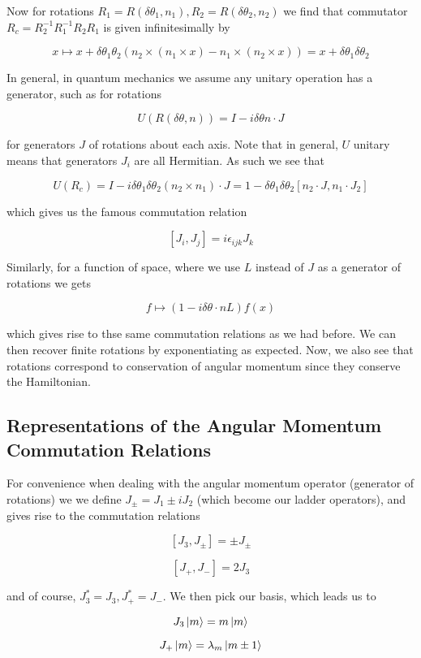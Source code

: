 \documentclass{article}
\theoremstyle{definition}
\begin{document}
Now for rotations $R_1 = R(\delta \theta_1, n_1), R_2 = R(\delta \theta_2, n_2)$
we find that commutator $R_c = R_2^{-1}R_1^{-1}R_2R_1$ is given infinitesimally
by

$$ x \mapsto x + \delta \theta_1 \theta_2 (n_2 \times (n_1 \times x) - n_1
\times (n_2 \times x)) = x + \delta \theta_1 \delta \theta_2 $$

In general, in quantum mechanics we assume any unitary operation has a
generator, such as for rotations

$$ U(R(\delta \theta, n)) = I - i \delta \theta n \cdot J $$

for generators $J$ of rotations about each axis. Note that in general, $U$
unitary means that generators $J_i$ are all Hermitian. As such we see that

$$ U(R_c) = I - i \delta \theta_1 \delta \theta_2 (n_2 \times n_1) \cdot J = 1 -
\delta \theta_1 \delta \theta_2 [n_2 \cdot J, n_1 \cdot J_2] $$

which gives us the famous commutation relation

$$ [J_i, J_j] = i \epsilon_{ijk} J_k $$

Similarly, for a function of space, where we use $L$ instead of $J$ as a
generator of rotations we gets

$$ f \mapsto (1 - i \delta \theta \cdot n L) f(x) $$

which gives rise to thse same commutation relations as we had before. We can
then recover finite rotations by exponentiating as expected. Now, we also see
that rotations correspond to conservation of angular momentum since they
conserve the Hamiltonian.

\subsection{Representations of the Angular Momentum Commutation Relations}

For convenience when dealing with the angular momentum operator (generator of
rotations) we we define $J_{\pm} = J_1 \pm iJ_2$ (which become our ladder
operators), and gives rise to the commutation relations

$$ [J_3, J_\pm] = \pm J_\pm $$

$$ [J_+, J_-] = 2 J_3 $$

and of course, $J_3^* = J_3, J_+^* = J_-$. We then pick our basis, which leads
us to

$$ J_3 \ket{m} = m \ket{m} $$

$$ J_+ \ket{m} = \lambda_m \ket{m \pm 1} $$
\end{document}
